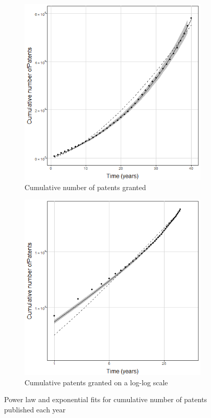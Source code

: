 \begin{figure}
\begin{subfigure}{.3\linewidth}
  \includegraphics[width=0.9\linewidth]{Figures/patentCountFit_cum}
  \caption[CumPatents1]{\footnotesize Cumulative number of patents granted}
\label{fig:patentCountFit_cum}
\end{subfigure}
\begin{subfigure}{.3\linewidth}
  \centering
  \includegraphics[width=0.9\linewidth]{Figures/patentCountFit_cum_loglog}
  \caption[CumPatents1]{\footnotesize Cumulative patents granted on a log-log scale}
\label{fig:patentCountFit_cum_loglog}
\end{subfigure}
\caption[Exponential fit for number of patents granted each year]{Power law and exponential fits for cumulative number of patents published each year}
\label{fig:cumulativePatentFits}
\end{figure}

